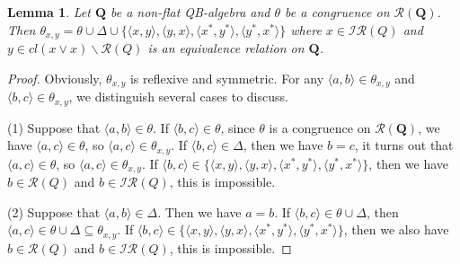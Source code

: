 \documentclass[12pt]{amsart}
\newtheorem{lemma}{Lemma}[section]
\theoremstyle{definition}
\theoremstyle{remark}
\numberwithin{equation}{section}
\begin{document}
\begin{lemma}\label{xy equ}
Let $\mathbf{Q}$ be a non-flat QB-algebra and $\theta$ be a congruence on $\mathscr{R}(\mathbf{Q})$. Then $\theta_{x,y}=\theta \cup \Delta \cup \{\langle x,y\rangle, \langle y,x\rangle, \langle x^{\ast},y^{\ast}\rangle, \langle y^{\ast},x^{\ast}\rangle \}$ where $x\in \mathscr{IR}(Q)$ and $y\in cl(x\vee x)\backslash\mathscr{R}(Q)$ is an equivalence relation on $\mathbf{Q}$.
\end{lemma}


\begin{proof}
Obviously, $\theta_{x,y}$ is reflexive and symmetric. For any $\langle a,b\rangle \in \theta_{x,y}$ and $\langle b,c\rangle \in \theta_{x,y}$, we distinguish several cases to discuss.

(1) Suppose that $\langle a,b\rangle \in \theta$. If $\langle b,c\rangle \in \theta$, since $\theta$ is a congruence on $\mathscr{R}(\mathbf{Q})$, we have $\langle a,c\rangle \in \theta$, so $\langle a,c\rangle \in \theta_{x,y}$. If $\langle b,c\rangle \in \Delta$, then we have $b=c$, it turns out that $\langle a,c\rangle \in \theta$, so $\langle a,c\rangle \in \theta_{x,y}$. If $\langle b,c\rangle\in \{\langle x,y\rangle, \langle y,x\rangle, \langle x^{\ast},y^{\ast}\rangle, \langle y^{\ast},x^{\ast}\rangle \}$, then we have $b\in \mathscr{R}(Q)$ and $b\in \mathscr{IR}(Q)$, this is impossible.

(2) Suppose that $\langle a,b\rangle \in \Delta$. Then we have $a=b$. If $\langle b,c\rangle\in \theta\cup \Delta$, then $\langle a,c\rangle\in\theta\cup \Delta\subseteq \theta_{x,y}$. If $\langle b,c\rangle\in \{\langle x,y\rangle, \langle y,x\rangle, \langle x^{\ast},y^{\ast}\rangle, \langle y^{\ast},x^{\ast}\rangle \}$, then we also have $b\in \mathscr{R}(Q)$ and $b\in \mathscr{IR}(Q)$, this is impossible.


\end{proof}
\end{document}
